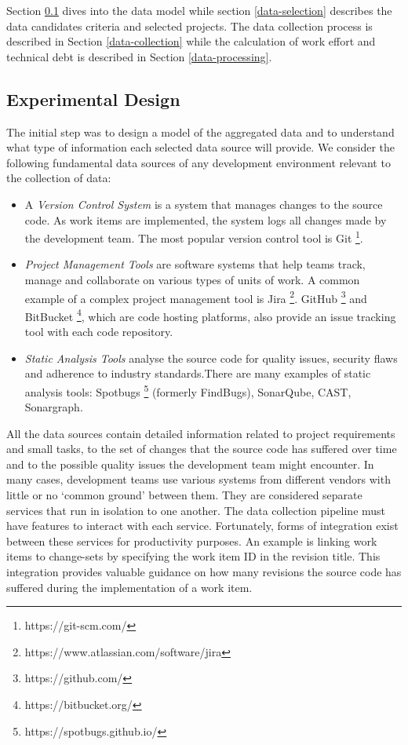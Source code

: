 \documentclass{mpaper}
\begin{document}
Section \ref{experimental-design} dives into the data model while section
\ref{data-selection} describes the data candidates criteria and selected
projects. The data collection process is described in Section
\ref{data-collection} while the calculation of work effort and technical debt is
described in Section \ref{data-processing}.

\subsection{Experimental Design}
\label{experimental-design}

The initial step was to design a model of the aggregated data and to understand
what type of information each selected data source will provide. We consider the
following fundamental data sources of any development environment relevant to
the collection of data:

\begin{itemize}
  \item A \emph{Version Control System} is a system that manages changes to the
  source code. As work items are implemented, the system logs all changes made
  by the development team. The most popular version control tool is Git
  \footnote{https://git-scm.com/}.

  \item \emph{Project Management Tools} are software systems that help teams
  track, manage and collaborate on various types of units of work. A common
  example of a complex project management tool is Jira
  \footnote{https://www.atlassian.com/software/jira}. GitHub
  \footnote{https://github.com/} and BitBucket
  \footnote{https://bitbucket.org/}, which are code hosting platforms, also
  provide an issue tracking tool with each code repository.
  
  \item \emph{Static Analysis Tools} analyse the source code for quality issues,
  security flaws and adherence to industry standards.There are many examples of
  static analysis tools: Spotbugs \footnote{https://spotbugs.github.io/}
  (formerly FindBugs), SonarQube, CAST, Sonargraph.

\end{itemize}

All the data sources contain detailed information related to project
requirements and small tasks, to the set of changes that the source code has
suffered over time and to the possible quality issues the development team might
encounter. In many cases, development teams use various systems from different
vendors with little or no `common ground' between them. They are considered
separate services that run in isolation to one another. The data collection
pipeline must have features to interact with each service. Fortunately, forms of
integration exist between these services for productivity purposes. An example
is linking work items to change-sets by specifying the work item ID in the
revision title. This integration provides valuable guidance on how many
revisions the source code has suffered during the implementation of a work item.
\end{document}
